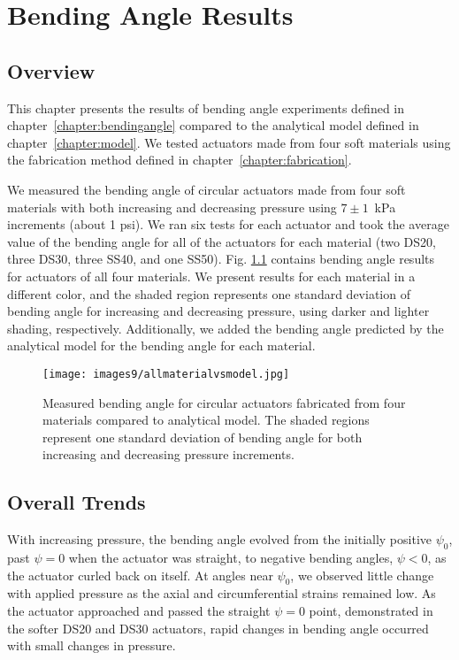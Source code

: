 \chapter{Bending Angle Results}
\label{chapter:results}

\section*{Overview}
This chapter presents the results of bending angle experiments defined in chapter~\ref{chapter:bendingangle} compared to the analytical model defined in chapter~\ref{chapter:model}. We tested actuators made from four soft materials using the fabrication method defined in chapter~\ref{chapter:fabrication}.

We measured the bending angle of circular actuators made from four soft materials with both increasing and decreasing pressure using $7\pm1$~kPa increments (about 1 psi). We ran six tests for each actuator and took the average value of the bending angle for all of the actuators for each material (two DS20, three DS30, three SS40, and one SS50). Fig. \ref{fig:allmaterialvsmodel} contains bending angle results for actuators of all four materials. We present results for each material in a different color, and the shaded region represents one standard deviation of bending angle for increasing and decreasing pressure, using darker and lighter shading, respectively. Additionally, we added the bending angle predicted by the analytical model for the bending angle for each material.

\begin{figure}[ht]
    \centering
     \texttt{[image: images9/allmaterialvsmodel.jpg]}
    \caption{Measured bending angle for circular actuators fabricated from four materials compared to analytical model. The shaded regions represent one standard deviation of bending angle for both increasing and decreasing pressure increments.}
    \label{fig:allmaterialvsmodel}
\end{figure}

\section{Overall Trends}

With increasing pressure, the bending angle evolved from the initially positive $\psi_0$, past $\psi=0$ when the actuator was straight, to negative bending angles, $\psi<0$, as the actuator curled back on itself. At angles near $\psi_0$, we observed little change with applied pressure as the axial and circumferential strains remained low. As the actuator approached and passed the straight $\psi=0$ point, demonstrated in the softer DS20 and DS30 actuators, rapid changes in bending angle occurred with small changes in pressure. 

